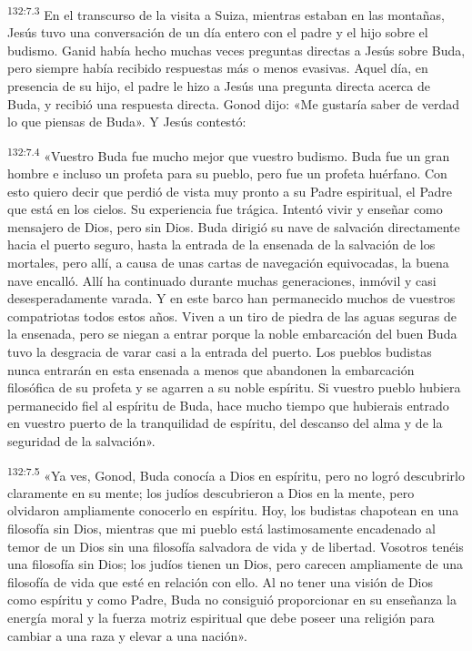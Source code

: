 \par
\textsuperscript{132:7.3} En el transcurso de la visita a Suiza, mientras estaban en las montañas, Jesús tuvo una conversación de un día entero con el padre y el hijo sobre el budismo. Ganid había hecho muchas veces preguntas directas a Jesús sobre Buda, pero siempre había recibido respuestas más o menos evasivas. Aquel día, en presencia de su hijo, el padre le hizo a Jesús una pregunta directa acerca de Buda, y recibió una respuesta directa. Gonod dijo: «Me gustaría saber de verdad lo que piensas de Buda». Y Jesús contestó:

\par
\textsuperscript{132:7.4} «Vuestro Buda fue mucho mejor que vuestro budismo. Buda fue un gran hombre e incluso un profeta para su pueblo, pero fue un profeta huérfano. Con esto quiero decir que perdió de vista muy pronto a su Padre espiritual, el Padre que está en los cielos. Su experiencia fue trágica. Intentó vivir y enseñar como mensajero de Dios, pero sin Dios. Buda dirigió su nave de salvación directamente hacia el puerto seguro, hasta la entrada de la ensenada de la salvación de los mortales, pero allí, a causa de unas cartas de navegación equivocadas, la buena nave encalló. Allí ha continuado durante muchas generaciones, inmóvil y casi desesperadamente varada. Y en este barco han permanecido muchos de vuestros compatriotas todos estos años. Viven a un tiro de piedra de las aguas seguras de la ensenada, pero se niegan a entrar porque la noble embarcación del buen Buda tuvo la desgracia de varar casi a la entrada del puerto. Los pueblos budistas nunca entrarán en esta ensenada a menos que abandonen la embarcación filosófica de su profeta y se agarren a su noble espíritu. Si vuestro pueblo hubiera permanecido fiel al espíritu de Buda, hace mucho tiempo que hubierais entrado en vuestro puerto de la tranquilidad de espíritu, del descanso del alma y de la seguridad de la salvación».

\par
\textsuperscript{132:7.5} «Ya ves, Gonod, Buda conocía a Dios en espíritu, pero no logró descubrirlo claramente en su mente; los judíos descubrieron a Dios en la mente, pero olvidaron ampliamente conocerlo en espíritu. Hoy, los budistas chapotean en una filosofía sin Dios, mientras que mi pueblo está lastimosamente encadenado al temor de un Dios sin una filosofía salvadora de vida y de libertad. Vosotros tenéis una filosofía sin Dios; los judíos tienen un Dios, pero carecen ampliamente de una filosofía de vida que esté en relación con ello. Al no tener una visión de Dios como espíritu y como Padre, Buda no consiguió proporcionar en su enseñanza la energía moral y la fuerza motriz espiritual que debe poseer una religión para cambiar a una raza y elevar a una nación».

